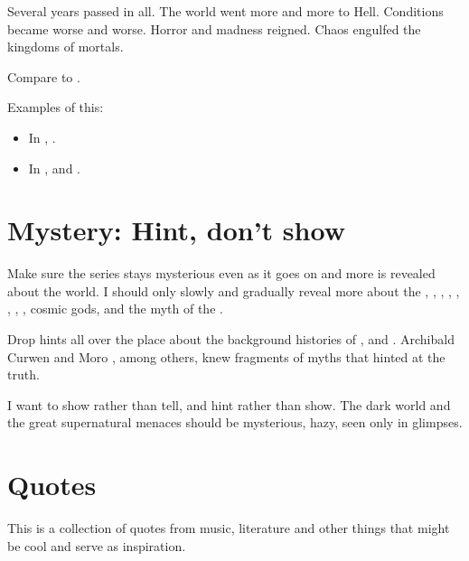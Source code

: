 Several years passed in all.
The world went more and more to Hell. 
Conditions became worse and worse.
Horror and madness reigned.
Chaos engulfed the kingdoms of mortals. 

Compare to \cite{RPG:CallofCthulhu:EndTime}. 

Examples of this:
\begin{itemize}
  \item 
    In \RamielsAwakeningBook, . 
  \item 
    In \ThirdBanewarBook,  and . 
\end{itemize}
















\section{Mystery: Hint, don't show}
Make sure the \Miith series stays mysterious even as it goes on and more is revealed about the world. 
I should only slowly and gradually reveal more about the \Archons, \Taorthae, \arcana, \Primordials, \xss, \banes, \Lithrim, \neoresphain, cosmic gods, \Sethicus and the myth of the . 

Drop hints all over the place about the background histories of \dragons, \resphain and \banes. 
Archibald Curwen and Moro \Cobrel, among others, knew fragments of myths that hinted at the truth. 

I want to show rather than tell, and hint rather than show. 
The dark world and the great supernatural menaces should be mysterious, hazy, seen only in glimpses.













\section{Quotes}
This is a collection of quotes from music, literature and other things that might be cool and serve as inspiration.









